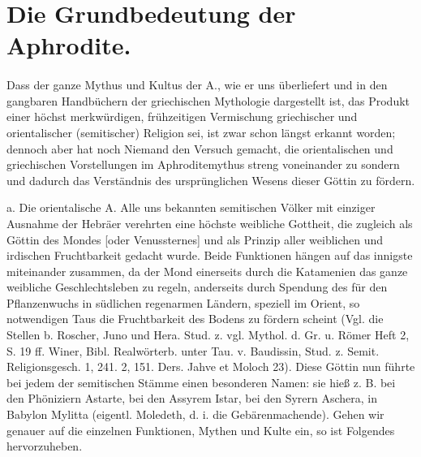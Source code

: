 \documentclass[a4paper, 11pt, oneside]{article}
\begin{document}
\section{Die Grundbedeutung der Aphrodite.}
\paragraph{}
Dass der ganze Mythus und Kultus der A., wie er uns überliefert und in den gangbaren Handbüchern der griechischen Mythologie dargestellt ist, das Produkt einer höchst merkwürdigen, frühzeitigen Vermischung griechischer und orientalischer (semitischer) Religion sei, ist zwar schon längst erkannt worden; dennoch aber hat noch Niemand den Versuch gemacht, die orientalischen und griechischen Vorstellungen im Aphroditemythus streng voneinander zu sondern und dadurch das Verständnis des ursprünglichen Wesens dieser Göttin zu fördern.

a. Die orientalische A. Alle uns bekannten semitischen Völker mit einziger Ausnahme der Hebräer verehrten eine höchste weibliche Gottheit, die zugleich als Göttin des Mondes [oder Venussternes] und als Prinzip aller weiblichen und irdischen Fruchtbarkeit gedacht wurde. Beide Funktionen hängen auf das innigste miteinander zusammen, da der Mond einerseits durch die Katamenien das ganze weibliche Geschlechtsleben zu regeln, anderseits durch Spendung des für den Pflanzenwuchs in südlichen regenarmen Ländern, speziell im Orient, so notwendigen Taus die Fruchtbarkeit des Bodens zu fördern scheint (Vgl. die Stellen b. Roscher, Juno und Hera. Stud. z. vgl. Mythol. d. Gr. u. Römer Heft 2, S. 19 ff. Winer, Bibl. Realwörterb. unter Tau. v. Baudissin, Stud. z. Semit. Religionsgesch. 1, 241. 2, 151. Ders. Jahve et Moloch 23). Diese Göttin nun führte bei jedem der semitischen Stämme einen besonderen Namen: sie hieß z. B. bei den Phöniziern Astarte, bei den Assyrem Istar, bei den Syrern Aschera, in Babylon Mylitta (eigentl. Moledeth, d. i. die Gebärenmachende). Gehen wir genauer auf die einzelnen Funktionen, Mythen und Kulte ein, so ist Folgendes hervorzuheben.
\end{document}
